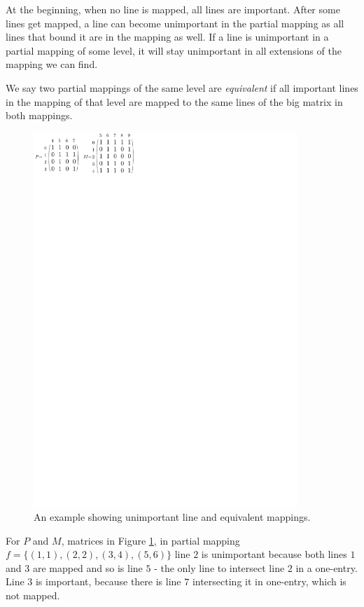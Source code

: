 At the beginning, when no line is mapped, all lines are important. After some lines get mapped, a line can become unimportant in the partial mapping as all lines that bound it are in the mapping as well. If a line is unimportant in a partial mapping of some level, it will stay unimportant in all extensions of the mapping we can find.
\begin{defn}
We say two partial mappings of the same level are \emph{equivalent} if all important lines in the mapping of that level are mapped to the same lines of the big matrix in both mappings.
\end{defn}
\begin{figure}[h!]
\centering
\includegraphics[width=100mm]{../img/equivalent.pdf}
\caption{An example showing unimportant line and equivalent mappings.}
\label{equivalent}
\end{figure}
For $P$ and $M$, matrices in Figure \ref{equivalent}, in partial mapping $f=\{(1,1),(2,2),(3,4),(5,6)\}$ line $2$ is unimportant because both lines $1$ and $3$ are mapped and so is line $5$ - the only line to intersect line $2$ in a one-entry. Line $3$ is important, because there is line $7$ intersecting it in one-entry, which is not mapped.

